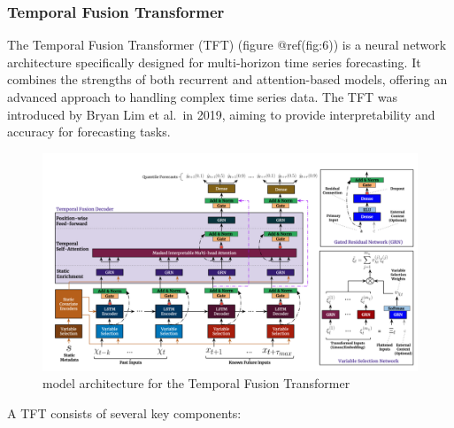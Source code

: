 \documentclass[
]{article}
\begin{document}
\hypertarget{temporal-fusion-transformer}{%
\subsubsection{Temporal Fusion
Transformer}\label{temporal-fusion-transformer}}

The Temporal Fusion Transformer (TFT) (figure @ref(fig:6)) is a neural
network architecture specifically designed for multi-horizon time series
forecasting. It combines the strengths of both recurrent and
attention-based models, offering an advanced approach to handling
complex time series data. The TFT was introduced by Bryan Lim et al.~in
2019, aiming to provide interpretability and accuracy for forecasting
tasks.

\begin{figure}

{\centering \includegraphics[width=500]{work/07-hydroLSTM/images/TFT} 

}

\caption{model architecture for the Temporal Fusion Transformer}\label{fig:6}
\end{figure}

A TFT consists of several key components:
\end{document}
